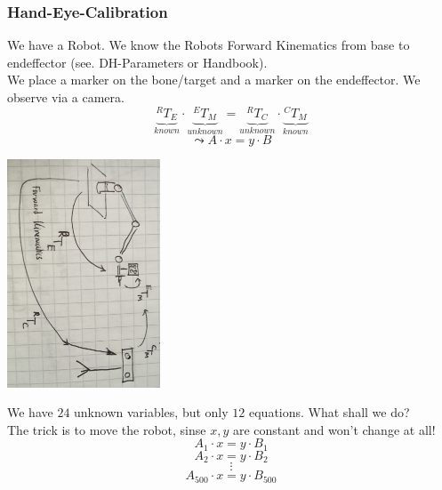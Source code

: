 \documentclass{exerciseBlue}
\begin{document}
\subsubsection{Hand-Eye-Calibration}
We have a Robot. We know the Robots Forward Kinematics from base to endeffector (see. DH-Parameters or Handbook).\\
We place a marker on the bone/target and a marker on the endeffector. We observe via a camera.
$$\underbrace{^RT_E}_{known}\cdot \underbrace{^ET_M}_{unknown} = \underbrace{^RT_C}_{unknown} \cdot \underbrace{^CT_M}_{known}$$
$$\leadsto A\cdot x = y \cdot B$$
\begin{center}
	\includegraphics[height = 6.8cm]{Images/RobotCameraCoordination}
\end{center}
We have $24$ unknown variables, but only $12$ equations. What shall we do?\\
The trick is to move the robot, sinse $x,y$ are constant and won't change at all!
$$A_1 \cdot x=y \cdot B_1$$
$$A_2 \cdot x=y \cdot B_2$$
$$\vdots$$
$$A_{500} \cdot x=y \cdot B_{500}$$
\newpage
\end{document}
